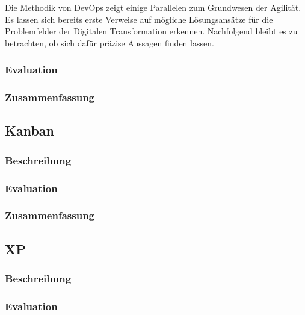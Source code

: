 Die Methodik von DevOps zeigt einige Parallelen zum Grundwesen der Agilität. Es lassen sich bereits erste Verweise auf mögliche Lösungsansätze für die Problemfelder der Digitalen Transformation erkennen. Nachfolgend bleibt es zu betrachten, ob sich dafür präzise Aussagen finden lassen. 

\subsubsection{Evaluation}

\todots

\subsubsection{Zusammenfassung}

\todots

\subsection{Kanban}

\subsubsection{Beschreibung}

\todots

\subsubsection{Evaluation}

\todots

\subsubsection{Zusammenfassung}

\todots

\subsection{XP}

\subsubsection{Beschreibung}

\todots

\subsubsection{Evaluation}


